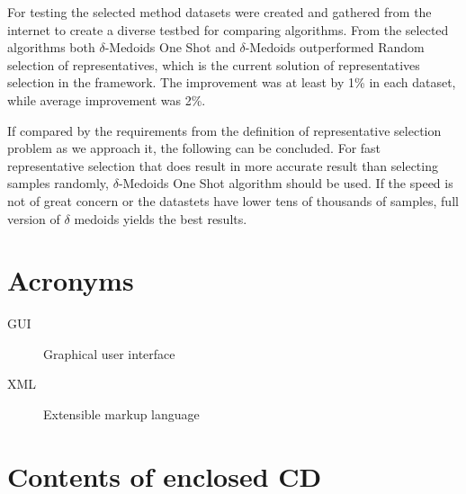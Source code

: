 \documentclass[thesis=B,english]{FITthesis}[2012/10/20]
\begin{document}
For testing the selected method datasets were created and gathered from the internet to create a diverse testbed for comparing algorithms.
From the selected algorithms both $\delta$-Medoids One Shot and $\delta$-Medoids outperformed Random selection of representatives, which is the current solution of representatives selection in the framework.
The improvement was at least by 1\% in each dataset, while average improvement was 2\%.  \\


If compared by the requirements from the definition of representative selection problem as we approach it, the following can be concluded.
For fast representative selection that does result in more accurate result than selecting samples randomly, $\delta$-Medoids One Shot algorithm should be used.
If the speed is not of great concern or the datastets have lower tens of thousands of samples, full version of $\delta$ medoids yields the best results.




\appendix

\chapter{Acronyms}
\begin{description}
	\item[GUI] Graphical user interface
	\item[XML] Extensible markup language
\end{description}


\chapter{Contents of enclosed CD}


\begin{figure}
\end{figure}
\end{document}
